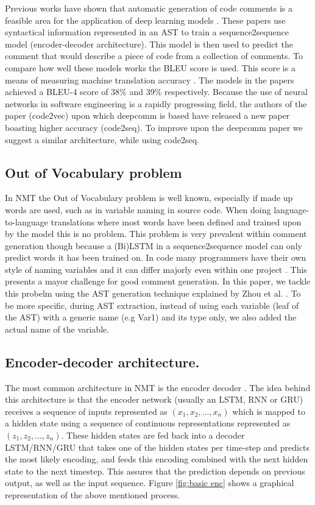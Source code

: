 \documentclass[a4paper,10pt]{article}
\theoremstyle{plain}
\theoremstyle{definition}
\begin{document}
\begin{multicols*}{2}
Previous works have shown that automatic generation of code comments is a feasible area for the application of deep learning models \cite{hu2018deep} \cite{Hu2019}. These papers use syntactical information represented in an AST to train a sequence2sequence model (encoder-decoder architecture). This model is then used to predict the comment that would describe a piece of code from a collection of comments. To compare how well these models works the BLEU score is used. This score is a means of measuring machine translation accuracy \cite{Papineni:2002:BMA:1073083.1073135}. The models in the papers \cite{hu2018deep} \cite{Hu2019} achieved a BLEU-4 score of 38\% and 39\% respectively. Because the use of neural networks in software engineering is a rapidly progressing field, the authors of the paper (code2vec) upon which deepcomm is based have released a new paper boasting higher accuracy (code2seq). To improve upon the deepcomm paper we suggest a similar architecture, while using code2seq. 

\subsection{Out of Vocabulary problem}
\label{OOV}
In NMT the Out of Vocabulary problem is well known, especially if made up words are used, such as in variable naming in source code. When doing language-to-language translations where most words have been defined and trained upon by the model this is no problem. This problem is very prevalent within comment generation though because a (Bi)LSTM in a sequence2sequence model can only predict words it has been trained on.  In code many programmers have their own style of naming variables and it can differ majorly even within one project \cite{hu2018deep}. This presents a mayor challenge for good comment generation. In this paper, we tackle this probelm using the AST generation technique explained by Zhou et al. \cite{ZHOU2019328}. To be more specific, during AST extraction, instead of using each variable (leaf of the AST) with a generic name (e.g Var1) and its type only, we also added the actual name of the variable.

\subsection{Encoder-decoder architecture.}
The most common architecture in NMT is the encoder decoder \cite{Graves13} \cite{alon2018code2seq} \cite{attentionisallyouneed}. The idea behind this architecture is that the encoder network (usually an LSTM, RNN or GRU) receives a sequence of inputs represented as $(x_1,x_2,...,x_n)$ which is mapped to a hidden state using a sequence of continuous representations represented as $(z_1,z_2,...,z_n)$. These hidden states are fed back into a decoder LSTM/RNN/GRU that takes one of the hidden states per time-step and predicts the most likely encoding, and feeds this encoding combined with the next hidden state to the next timestep. This assures that the prediction depends on previous output, as well as the input sequence. Figure \ref{fig:basic enc} shows a graphical representation of the above mentioned process.


\end{multicols*}
\end{document}
